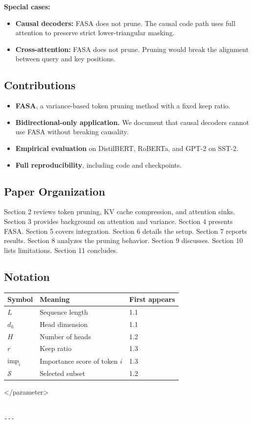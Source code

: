 \textbf{Special cases:}
\begin{itemize}
\item \textbf{Causal decoders:} FASA does not prune. The causal code path uses full
  attention to preserve strict lower-triangular masking.
\item \textbf{Cross-attention:} FASA does not prune. Pruning would break the
  alignment between query and key positions.

\end{itemize}
\subsection{Contributions}

\begin{itemize}
\item \textbf{FASA}, a variance-based token pruning method with a fixed keep ratio.
\item \textbf{Bidirectional-only application.} We document that causal decoders
  cannot use FASA without breaking causality.
\item \textbf{Empirical evaluation} on DistilBERT, RoBERTa, and GPT-2 on SST-2.
\item \textbf{Full reproducibility}, including code and checkpoints.

\end{itemize}
\subsection{Paper Organization}

Section 2 reviews token pruning, KV cache compression, and attention sinks. 
Section 3 provides background on attention and variance. Section 4 presents 
FASA. Section 5 covers integration. Section 6 details the setup. Section 7 
reports results. Section 8 analyzes the pruning behavior. Section 9 
discusses. Section 10 lists limitations. Section 11 concludes.



\subsection{Notation}

\begin{table}[H]
\centering
\small
\begin{tabular}{lll}
\toprule
\textbf{Symbol} & \textbf{Meaning} & \textbf{First appears} \\
\midrule
$L$ & Sequence length & 1.1 \\
$d_h$ & Head dimension & 1.1 \\
$H$ & Number of heads & 1.2 \\
$r$ & Keep ratio & 1.3 \\
$\text{imp}_i$ & Importance score of token $i$ & 1.3 \\
$\mathcal{S}$ & Selected subset & 1.2 \\
\bottomrule
\end{tabular}
\end{table}
\textless{}/parameter\textgreater{}
\begin{lstlisting}

---
\end{lstlisting}

